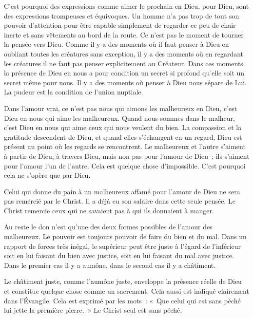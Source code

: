 \documentclass[french,twoside]{book} %
\begin{document}
C'est pourquoi des expressions comme aimer le prochain en Dieu, pour Dieu, sont des expressions trompeuses et équivoques. Un homme n'a pas trop de tout son pouvoir d'attention pour être capable simplement de regarder ce peu de chair inerte et sans vêtements au bord de la route. Ce n'est pas le moment de tourner la pensée vers Dieu. Comme il y a des moments où il faut penser à Dieu en oubliant toutes les créatures sans exception, il y a des moments où en regardant les créatures il ne faut pas penser explicitement au Créateur. Dans ces moments la présence de Dieu en nous a pour condition un secret si profond qu'elle soit un secret même pour nous. Il y a des moments où penser à Dieu nous sépare de Lui. La pudeur est la condition de l'union nuptiale.\par
Dans l'amour vrai, ce n'est pas nous qui aimons les malheureux en Dieu, c'est Dieu en nous qui aime les malheureux. Quand nous sommes dans le malheur, c'est Dieu en nous qui aime ceux qui nous veulent du bien. La compassion et la gratitude descendent de Dieu, et quand elles s'échangent en un regard, Dieu est présent au point où les regards se rencontrent. Le malheureux et l'autre s'aiment à partir de Dieu, à travers Dieu, mais non pas pour l'amour de Dieu ; ils s'aiment pour l'amour l'un de l'autre. Cela est quelque chose d'impossible. C'est pourquoi cela ne s'opère que par Dieu.\par
Celui qui donne du pain à un malheureux affamé pour l'amour de Dieu ne sera pas remercié par le Christ. Il a déjà eu son salaire dans cette seule pensée. Le Christ remercie ceux qui ne savaient pas à qui ils donnaient à manger.\par
Au reste le don n'est qu'une des deux formes possibles de l'amour des malheureux. Le pouvoir est toujours pouvoir de faire du bien et du mal. Dans un rapport de forces très inégal, le supérieur peut être juste à l'égard de l'inférieur soit en lui faisant du bien avec justice, soit en lui faisant du mal avec justice. Dans le premier cas il y a aumône, dans le second cas il y a châtiment.\par
Le châtiment juste, comme l'aumône juste, enveloppe la présence réelle de Dieu et constitue quelque chose comme un sacrement. Cela aussi est indiqué clairement dans l'Évangile. Cela est exprimé par les mots : « Que celui qui est sans péché lui jette la première pierre. » Le Christ seul est sans péché.\par
\end{document}
